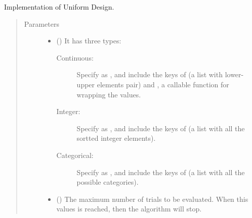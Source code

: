 \documentclass[letterpaper,10pt,english]{sphinxmanual}
\begin{document}
\begin{fulllineitems}
\label{\detokenize{apidoc:pybatdoe.batch_ud.UDSearch}}
Implementation of Uniform Design.
\begin{quote}\begin{description}
\item[{Parameters}] \leavevmode\begin{itemize}
\item {} 
 () \textendash{} 
It has three types:
\begin{description}
\item[{Continuous: }] \leavevmode
Specify  as , and include the keys of  (a list with lower-upper elements pair) and
, a callable function for wrapping the values.

\item[{Integer:}] \leavevmode
Specify  as , and include the keys of  (a list with all the sortted integer elements).

\item[{Categorical:}] \leavevmode
Specify  as , and include the keys of  (a list with all the possible categories).

\end{description}


\item {} 
 (\sphinxstyleliteralemphasis{\sphinxupquote{, }}\sphinxstyleliteralemphasis{\sphinxupquote{, }}) \textendash{} The maximum number of trials to be evaluated. When this values is reached, 
then the algorithm will stop.


\end{itemize}
\end{description}
\end{quote}
\end{fulllineitems}
\end{document}
